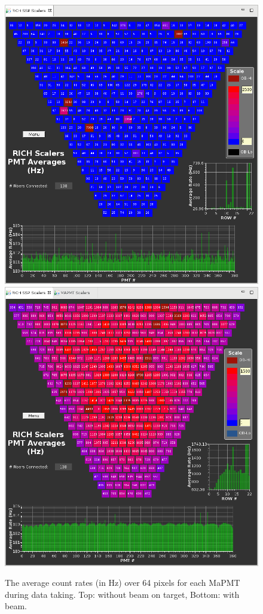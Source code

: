 \documentclass[5p,times,twocolumn]{elsarticle}
\begin{document}
\begin{figure}[t]
\begin{center}
\includegraphics[width=0.7\columnwidth]{Scalers_BeamOff.png}
\includegraphics[width=0.7\columnwidth]{Scalers_BeamOn.png}
\end{center}
\caption{The average count rates (in Hz) over 64 pixels for each MaPMT during data taking. Top: without beam on
  target, Bottom: with beam.}
\label{fig:Online_Scalers}
\end{figure}
\end{document}
